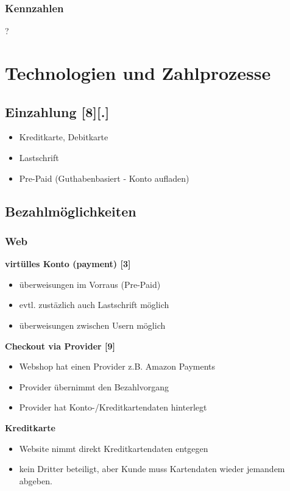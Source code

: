 \subsubsection{ Kennzahlen}
?



\section{Technologien und Zahlprozesse}

\subsection{ Einzahlung [8][.]}
	\begin{itemize}
	\item Kreditkarte, Debitkarte
	\item Lastschrift
	\item Pre-Paid (Guthabenbasiert - Konto aufladen)
	\end{itemize}


\subsection{ Bezahlmöglichkeiten}
\subsubsection{ Web}
\textbf{ virtülles Konto (payment) [3]}\\
	\begin{itemize}
	\item überweisungen im Vorraus (Pre-Paid)
	\item evtl. zustäzlich auch Lastschrift möglich
	\item überweisungen zwischen Usern möglich
	\end{itemize}

\textbf{ Checkout via Provider [9]}\\
	\begin{itemize}
	\item Webshop hat einen Provider z.B. Amazon Payments
	\item Provider übernimmt den Bezahlvorgang
	\item Provider hat Konto-/Kreditkartendaten hinterlegt 
	\end{itemize}

\textbf{ Kreditkarte}\\
	\begin{itemize}
	\item Website nimmt direkt Kreditkartendaten entgegen
	\item kein Dritter beteiligt, aber Kunde muss Kartendaten wieder jemandem abgeben.
	\end{itemize}

